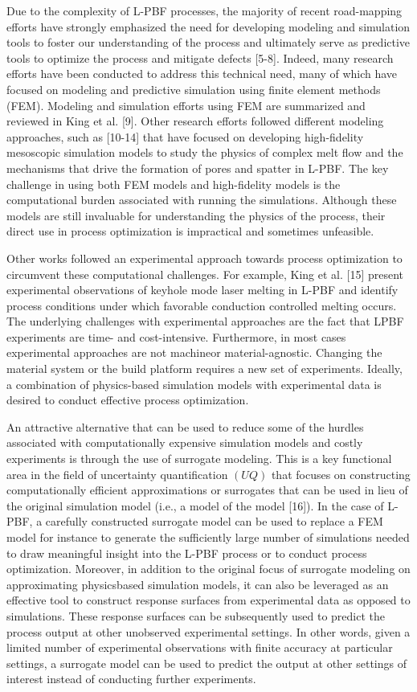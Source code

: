 \documentclass[10pt]{article}
\begin{document}
Due to the complexity of L-PBF processes, the majority of recent road-mapping efforts have strongly emphasized the need for developing modeling and simulation tools to foster our understanding of the process and ultimately serve as predictive tools to optimize the process and mitigate defects [5-8]. Indeed, many research efforts have been conducted to address this technical need, many of which have focused on modeling and predictive simulation using finite element methods (FEM). Modeling and simulation efforts using FEM are summarized and reviewed in King et al. [9]. Other research efforts followed different modeling approaches, such as [10-14] that have focused on developing high-fidelity mesoscopic simulation models to study the physics of complex melt flow and the mechanisms that drive the formation of pores and spatter in L-PBF. The key challenge in using both FEM models and high-fidelity models is the computational burden associated with running the simulations. Although these models are still invaluable for understanding the physics of the process, their direct use in process optimization is impractical and sometimes unfeasible.

Other works followed an experimental approach towards process optimization to circumvent these computational challenges. For example, King et al. [15] present experimental observations of keyhole mode laser melting in L-PBF and identify process conditions under which favorable conduction controlled melting occurs. The underlying challenges with experimental approaches are the fact that LPBF experiments are time- and cost-intensive. Furthermore, in most cases experimental approaches are not machineor material-agnostic. Changing the material system or the build platform requires a new set of experiments. Ideally, a combination of physics-based simulation models with experimental data is desired to conduct effective process optimization.

An attractive alternative that can be used to reduce some of the hurdles associated with computationally expensive simulation models and costly experiments is through the use of surrogate modeling. This is a key functional area in the field of uncertainty quantification $(U Q)$ that focuses on constructing computationally efficient approximations or surrogates that can be used in lieu of the original simulation model (i.e., a model of the model [16]). In the case of L-PBF, a carefully constructed surrogate model can be used to replace a FEM model for instance to generate the sufficiently large number of simulations needed to draw meaningful insight into the L-PBF process or to conduct process optimization. Moreover, in addition to the original focus of surrogate modeling on approximating physicsbased simulation models, it can also be leveraged as an effective tool to construct response surfaces from experimental data as opposed to simulations. These response surfaces can be subsequently used to predict the process output at other unobserved experimental settings. In other words, given a limited number of experimental observations with finite accuracy at particular settings, a surrogate model can be used to predict the output at other settings of interest instead of conducting further experiments.
\end{document}
